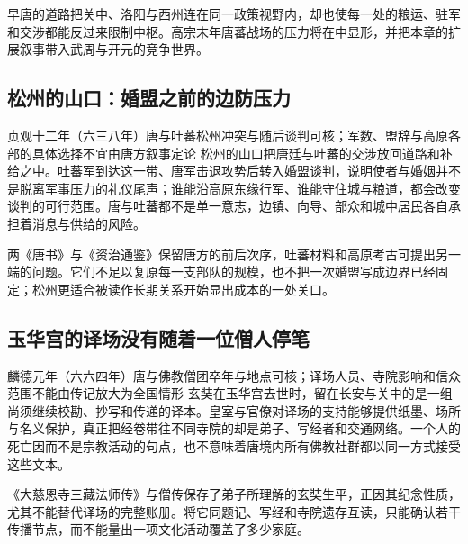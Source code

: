早唐的道路把关中、洛阳与西州连在同一政策视野内，却也使每一处的粮运、驻军和交涉都能反过来限制中枢。高宗末年唐蕃战场的压力将在中显形，并把本章的扩展叙事带入武周与开元的竞争世界。

\subsection{松州的山口：婚盟之前的边防压力}
\begin{event}{}{贞观十二年（六三八年）}{唐与吐蕃}{松州冲突与随后谈判可核；军数、盟辞与高原各部的具体选择不宜由唐方叙事定论}
松州的山口把唐廷与吐蕃的交涉放回道路和补给之中。吐蕃军到达这一带、唐军击退攻势后转入婚盟谈判，说明使者与婚姻并不是脱离军事压力的礼仪尾声；谁能沿高原东缘行军、谁能守住城与粮道，都会改变谈判的可行范围。唐与吐蕃都不是单一意志，边镇、向导、部众和城中居民各自承担着消息与供给的风险。

两《唐书》与《资治通鉴》保留唐方的前后次序，吐蕃材料和高原考古可提出另一端的问题。它们不足以复原每一支部队的规模，也不把一次婚盟写成边界已经固定；松州更适合被读作长期关系开始显出成本的一处关口。
\end{event}

\subsection{玉华宫的译场没有随着一位僧人停笔}
\begin{event}{}{麟德元年（六六四年）}{唐与佛教僧团}{卒年与地点可核；译场人员、寺院影响和信众范围不能由传记放大为全国情形}
玄奘在玉华宫去世时，留在长安与关中的是一组尚须继续校勘、抄写和传递的译本。皇室与官僚对译场的支持能够提供纸墨、场所与名义保护，真正把经卷带往不同寺院的却是弟子、写经者和交通网络。一个人的死亡因而不是宗教活动的句点，也不意味着唐境内所有佛教社群都以同一方式接受这些文本。

《大慈恩寺三藏法师传》与僧传保存了弟子所理解的玄奘生平，正因其纪念性质，尤其不能替代译场的完整账册。将它同题记、写经和寺院遗存互读，只能确认若干传播节点，而不能量出一项文化活动覆盖了多少家庭。
\end{event}